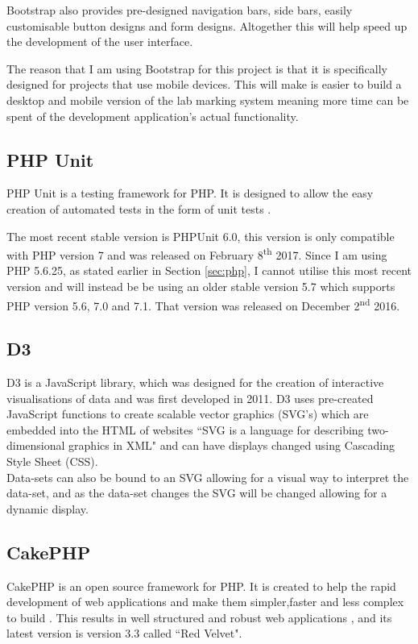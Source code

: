 \documentclass[11pt]{report}
\begin{document}
Bootstrap also provides pre-designed navigation bars, side bars, easily customisable button designs and form designs. Altogether this will help speed up the development of the user interface.

The reason that I am using Bootstrap for this project is that it is specifically designed for projects that use mobile devices. This will make is easier to build a desktop and mobile version of the lab marking system meaning more time can be spent of the development application's actual functionality.



\subsection{PHP Unit}

PHP Unit is a testing framework for PHP. It is designed to allow the easy creation of automated tests in the form of unit tests \cite{bergmann_phpunit_2005}. 

The most recent stable version is PHPUnit 6.0, this version is only compatible with PHP version 7 and was released on February 8\textsuperscript{th} 2017. Since I am using PHP 5.6.25, as stated earlier in Section \ref{sec:php}, I cannot utilise this most recent version and will instead be be using an older stable version 5.7 which supports PHP version 5.6, 7.0 and 7.1. That version was released on  December 2\textsuperscript{nd} 2016.



\subsection{D3}
D3 \cite{bostock_d3.js_????-1} is a JavaScript library, which was designed for the creation of interactive visualisations of data and was first developed in 2011. D3 uses pre-created JavaScript functions to create scalable vector graphics (SVG's) which are embedded into the HTML of websites ``SVG is a language for describing two-dimensional graphics in XML"\cite{ferraiolo_scalable_2000-1} and can have displays changed using Cascading Style Sheet (CSS).  \\
Data-sets can also be bound to an SVG allowing for a visual way to interpret the data-set, and as the data-set changes the SVG will be changed allowing for a dynamic display.



\subsection{CakePHP}
CakePHP is an open source framework for PHP. It is created to help the rapid development of web applications and make them simpler,faster and less complex to build \cite{_cakephp_????-1}. This results in  well structured and robust web applications \cite{plekhanova_evaluating_2009-1}, and its latest version is version 3.3 called ``Red Velvet".
\end{document}
